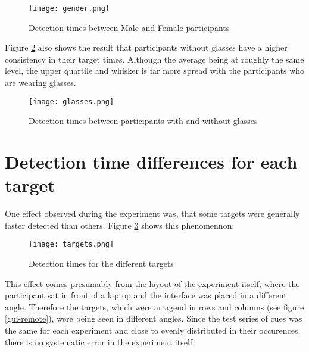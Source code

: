             \begin{figure}[h]     %
                \centering
                \texttt{[image: gender.png]} 
                \caption{Detection times between Male and Female participants}\label{gender}
            \end{figure} 

            Figure \ref*{glasses} also shows the result that participants without glasses have a higher consistency in their target times. Although the average being at roughly the same level, the upper quartile and whisker is far more spread with the participants who are wearing glasses. 

            \begin{figure}[h]     %
                \centering
                \texttt{[image: glasses.png]} 
                \caption{Detection times between participants with and without glasses}\label{glasses}
            \end{figure}

        \section{Detection time differences for each target}

            One effect observed during the experiment was, that some targets were generally faster detected than others. Figure \ref*{targets} shows this phenomennon:

            \begin{figure}[h]     %
                \centering
                \texttt{[image: targets.png]} 
                \caption{Detection times for the different targets }\label{targets}
            \end{figure}

            This effect comes presumably from the layout of the experiment itself, where the participant sat in front of a laptop and the interface was placed in a different angle. Therefore the targets, which were arragend in rows and columns (see figure \ref*{gui-remote}), were being seen in different angles. Since the test series of cues was the same for each experiment and close to evenly distributed in their occurences, there is no systematic error in the experiment itself.
            
